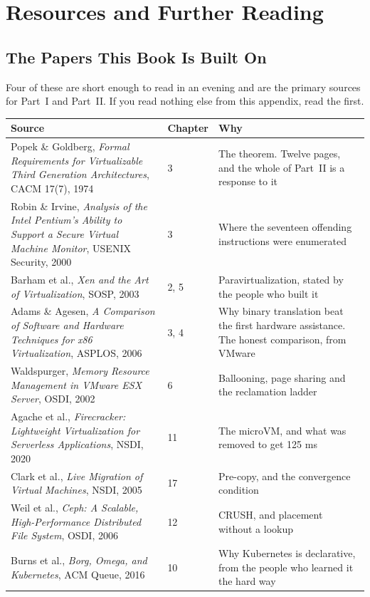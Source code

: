 \chapter{Resources and Further Reading}\label{app:resources}
\normalfigures

\section{The Papers This Book Is Built On}

Four of these are short enough to read in an evening and are the primary
sources for Part~I and Part~II. If you read nothing else from this appendix,
read the first.

\begin{longtable}{@{}L{5.6cm}L{2.0cm}L{7.0cm}@{}}
\toprule
{}
\textbf{Source} & \textbf{Chapter} & \textbf{Why} \\
\midrule
\endhead
Popek \& Goldberg, \emph{Formal Requirements for Virtualizable Third Generation
Architectures}, CACM 17(7), 1974 & 3 & The theorem. Twelve pages, and the whole
of Part~II is a response to it \\
Robin \& Irvine, \emph{Analysis of the Intel Pentium's Ability to Support a
Secure Virtual Machine Monitor}, USENIX Security, 2000 & 3 & Where the
seventeen offending instructions were enumerated \\
Barham et al., \emph{Xen and the Art of Virtualization}, SOSP, 2003 & 2, 5 &
Paravirtualization, stated by the people who built it \\
Adams \& Agesen, \emph{A Comparison of Software and Hardware Techniques for
x86 Virtualization}, ASPLOS, 2006 & 3, 4 & Why binary translation beat the
first hardware assistance. The honest comparison, from VMware \\
Waldspurger, \emph{Memory Resource Management in VMware ESX Server}, OSDI,
2002 & 6 & Ballooning, page sharing and the reclamation ladder \\
Agache et al., \emph{Firecracker: Lightweight Virtualization for Serverless
Applications}, NSDI, 2020 & 11 & The microVM, and what was removed to get
125 ms \\
Clark et al., \emph{Live Migration of Virtual Machines}, NSDI, 2005 & 17 &
Pre-copy, and the convergence condition \\
Weil et al., \emph{Ceph: A Scalable, High-Performance Distributed File
System}, OSDI, 2006 & 12 & CRUSH, and placement without a lookup \\
Burns et al., \emph{Borg, Omega, and Kubernetes}, ACM Queue, 2016 & 10 & Why
Kubernetes is declarative, from the people who learned it the hard way \\
\bottomrule
\end{longtable}

